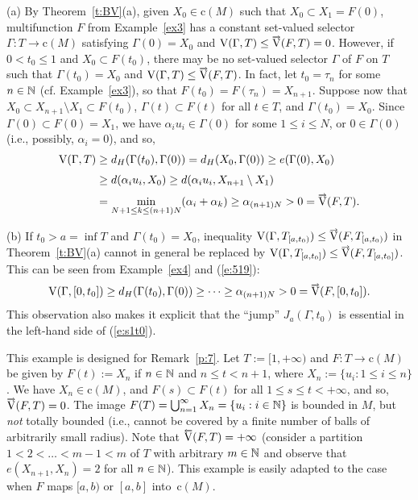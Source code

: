 \documentclass[preprint,12pt]{elsarticle}
\newcommand{\eq}[1]{\mbox{\rm(\ref{#1})}}
\newcommand{\nV}{\mbox{\rm V}}
\newcommand{\riV}{{\scriptstyle\overrightarrow{\mbox{\rm V}}}}
\newcommand{\leV}{{\scriptstyle\overleftarrow{\mbox{\rm V}}}}
\begin{document}
\begin{exa} \label{ex4}
(a) By Theorem~\ref{t:BV}(a), given $X_0\in\mbox{c}(M)$ such that
$X_0\subset X_1=F(0)$, multifunction $F$ from Example~\ref{ex3} has a constant
set-valued selector $\Gamma:T\to\mbox{c}(M)$ satisfying $\Gamma(0)=X_0$
and $\nV(\Gamma,T)\le\riV(F,T)=0$. However, if $0<t_0\le1$ and $X_0\subset F(t_0)$,
there may be no set-valued selector $\Gamma$ of $F$ on $T$ such that
$\Gamma(t_0)=X_0$ and $\nV(\Gamma,T)\le\riV(F,T)$. In fact, let $t_0=\tau_n$
for some $n\in\mathbb{N}$ (cf. Example~\ref{ex3}), so that $F(t_0)=F(\tau_n)=X_{n+1}$.
Suppose now that $X_0\subset X_{n+1}\setminus X_1\subset F(t_0)$,
$\Gamma(t)\subset F(t)$ for all $t\in T$, and $\Gamma(t_0)=X_0$. Since
$\Gamma(0)\subset F(0)=X_1$, we have $\alpha_iu_i\in\Gamma(0)$ for some
$1\le i\le N$, or $0\in\Gamma(0)$ (i.e., possibly, $\alpha_i=0$), and so,
  \begin{align}
\nV(\Gamma,T)&\ge d_H(\Gamma(t_0),\Gamma(0))=d_H(X_0,\Gamma(0))
  \ge e(\Gamma(0),X_0)\nonumber\\[3pt]
&\ge d(\alpha_iu_i,X_0)\ge d(\alpha_iu_i,X_{n+1}\setminus X_1)\nonumber\\[2pt]
&=\min_{N+1\le k\le (n+1)N}(\alpha_i+\alpha_k)\ge\alpha_{(n+1)N}
  >0=\riV(F,T).\label{e:519}
  \end{align}

(b) If $t_0>a=\inf T$ and $\Gamma(t_0)=X_0$, inequality
$\nV(\Gamma,T_{[a,t_0)})\le\riV(F,T_{[a,t_0)})$ in Theorem~\ref{t:BV}(a) cannot
in general be replaced by $\nV(\Gamma,T_{[a,t_0]})\le\riV(F,T_{[a,t_0]})$.
This can be seen from Example~\ref{ex4} and \eq{e:519}:
  \begin{equation*}
\nV(\Gamma,[0,t_0])\ge d_H(\Gamma(t_0),\Gamma(0))\ge\dots\ge
\alpha_{(n+1)N}>0=\riV(F,[0,t_0]).
  \end{equation*}
This observation also makes it explicit that the ``jump'' $J_a(\Gamma,t_0)$ is
essential  in the left-hand side of \eq{e:s1t0}.
\end{exa}

\begin{exa} \label{ex:5.5}
This example is designed for Remark~\ref{p:7}. Let $T:=[1,+\infty)$ and
$F:T\to\mbox{c}(M)$ be given by $F(t)\!:=\!X_n$ if $n\in\mathbb{N}$ and $n\le t<n+1$,
where $X_n\!:=\!\{u_i:1\le i\le n\}$. We have $X_n\in\mbox{c}(M)$, and
$F(s)\subset F(t)$ for all $1\le s\le t<+\infty$, and so, $\riV(F,T)=0$. The image
\mbox{$F(T)=\bigcup_{n=1}^\infty X_n=\{u_i:i\in\mathbb{N}\}$} is bounded in $M$,
but \emph{not\/} totally bounded (i.e., cannot be covered by a finite number of balls
of arbitrarily small radius). Note that $\leV(F,T)=+\infty$ (consider a partition
$1<2<\dots<m-1<m$ of $T$ with arbitrary $m\in\mathbb{N}$ and observe that
$e(X_{n+1},X_n)=2$ for all $n\in\mathbb{N}$). This example is easily adapted to the case
when $F$ maps $[a,b)$ or $[a,b]$ into~$\mbox{c}(M)$.
\end{exa}
\end{document}
